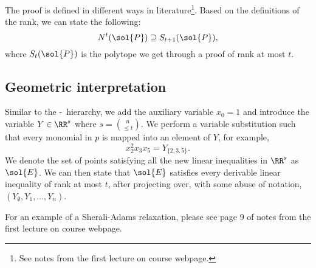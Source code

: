 \documentclass[a4paper,twoside,justified]{tufte-handout}
\begin{document}
The  proof is defined in different ways in literature\footnote{See notes from the first lecture on course webpage.}. Based on the definitions of the rank, we can state the following:
\begin{equation}
 N^{t}(\sol{P}) \supseteq S_{t+1}(\sol{P}) ,
\end{equation}
where $S_{t}(\sol{P})$ is the polytope we get through a proof of rank at most $ t $.

\subsection{Geometric interpretation}
Similar to the \Lovasz-\Schrijver\ hierarchy, we add the auxiliary variable $x_0=1$ and introduce the variable $Y\in \RR^{s} $ where $ s=\binom{n}{\leq t}$. We perform a variable substitution such that every monomial in $p$ is mapped into an element of $Y$, for example,
\begin{equation*}
x^{2}_{2} x_{3}x_{5} = Y_{\{2,3,5\}}. 
\end{equation*}
We denote the set of points satisfying all the new linear inequalities in $\RR^{s}$ as $\sol{E}$. We can then state that $\sol{E}$ satisfies every derivable linear inequality of rank at most $t$, after projecting over, with some abuse of notation, $(Y_{\emptyset},Y_{1},\ldots,Y_{n})$.

For an example of a Sherali-Adams relaxation, please see page 9 of notes from the first lecture on course webpage.





\end{document}

